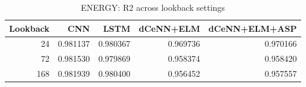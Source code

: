 \begin{table}
\caption{ENERGY: R2 across lookback settings}
\begin{tabular}{rrrrr}
\toprule
Lookback & CNN & LSTM & dCeNN+ELM & dCeNN+ELM+ASP \\
\midrule
24 & 0.981137 & 0.980367 & 0.969736 & 0.970166 \\
72 & 0.981530 & 0.979869 & 0.958374 & 0.958420 \\
168 & 0.981939 & 0.980400 & 0.956452 & 0.957557 \\
\bottomrule
\end{tabular}
\end{table}
